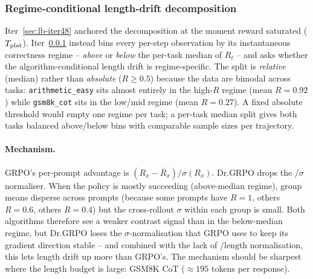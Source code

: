 
\subsubsection{Regime-conditional length-drift decomposition}\label{sec:lb-iter52}

Iter~\ref{sec:lb-iter48} anchored the decomposition at the moment reward
saturated ($T_{\text{plat}}$). Iter~\ref{sec:lb-iter52} instead bins every per-step
observation by its instantaneous correctness regime -- \emph{above} or
\emph{below} the per-task median of $R_t$ -- and asks whether the
algorithm-conditional length drift is regime-specific. The split is
\emph{relative} (median) rather than \emph{absolute} ($R \geq 0.5$)
because the data are bimodal across tasks: \texttt{arithmetic\_easy} sits
almost entirely in the high-$R$ regime (mean $R = 0.92$) while
\texttt{gsm8k\_cot} sits in the low/mid regime (mean $R = 0.27$). A
fixed absolute threshold would empty one regime per task; a per-task
median split gives both tasks balanced above/below bins with comparable
sample sizes per trajectory.

\paragraph{Mechanism.}
GRPO's per-prompt advantage is $(R_x - \bar{R}_x) / \sigma(R_x)$.
Dr.GRPO drops the $/ \sigma$ normaliser. When the policy is mostly
succeeding (above-median regime), group means disperse across prompts
(because some prompts have $R=1$, others $R=0.6$, others $R=0.4$) but
the cross-rollout $\sigma$ within each group is small. Both algorithms
therefore see a weaker contrast signal than in the below-median regime,
but Dr.GRPO loses the $\sigma$-normalisation that GRPO uses to keep
its gradient direction stable -- and combined with the lack of
$/ \text{length}$ normalisation, this lets length drift up more than
GRPO's. The mechanism should be sharpest where the length budget is
large: GSM8K CoT ($\approx 195$ tokens per response).

